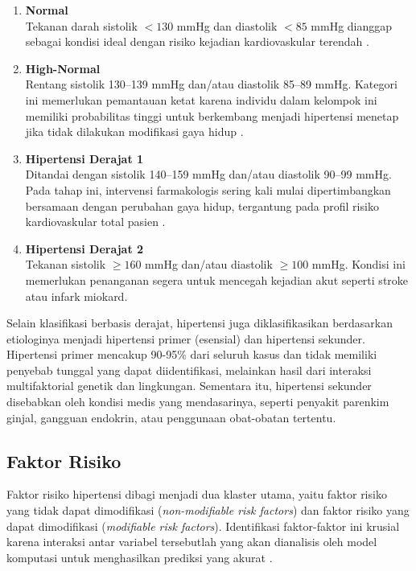 \begin{enumerate}[label=\arabic*., leftmargin=*]
    \item \textbf{Normal} \\
    Tekanan darah sistolik $<130$ mmHg dan diastolik $<85$ mmHg dianggap sebagai kondisi ideal dengan risiko kejadian kardiovaskular terendah .
    
    \item \textbf{High-Normal} \\
    Rentang sistolik 130--139 mmHg dan/atau diastolik 85--89 mmHg. Kategori ini memerlukan pemantauan ketat karena individu dalam kelompok ini memiliki probabilitas tinggi untuk berkembang menjadi hipertensi menetap jika tidak dilakukan modifikasi gaya hidup .
    
    \item \textbf{Hipertensi Derajat 1} \\
    Ditandai dengan sistolik 140--159 mmHg dan/atau diastolik 90--99 mmHg. Pada tahap ini, intervensi farmakologis sering kali mulai dipertimbangkan bersamaan dengan perubahan gaya hidup, tergantung pada profil risiko kardiovaskular total pasien \parencite{Unger2020International}.
    
    \item \textbf{Hipertensi Derajat 2} \\
    Tekanan sistolik $\ge160$ mmHg dan/atau diastolik $\ge100$ mmHg. Kondisi ini memerlukan penanganan segera untuk mencegah kejadian akut seperti stroke atau infark miokard.
\end{enumerate}
\vspace{1em} %
Selain klasifikasi berbasis derajat, hipertensi juga diklasifikasikan berdasarkan etiologinya menjadi hipertensi primer (esensial) dan hipertensi sekunder. Hipertensi primer mencakup 90-95\% dari seluruh kasus dan tidak memiliki penyebab tunggal yang dapat diidentifikasi, melainkan hasil dari interaksi multifaktorial genetik dan lingkungan. Sementara itu, hipertensi sekunder disebabkan oleh kondisi medis yang mendasarinya, seperti penyakit parenkim ginjal, gangguan endokrin, atau penggunaan obat-obatan tertentu.

\vspace{1em} %

\subsection{Faktor Risiko}
Faktor risiko hipertensi dibagi menjadi dua klaster utama, yaitu faktor risiko yang tidak dapat dimodifikasi (\textit{non-modifiable risk factors}) dan faktor risiko yang dapat dimodifikasi (\textit{modifiable risk factors}). Identifikasi faktor-faktor ini krusial karena interaksi antar variabel tersebutlah yang akan dianalisis oleh model komputasi untuk menghasilkan prediksi yang akurat \parencite{Hegde2022Influence}.

